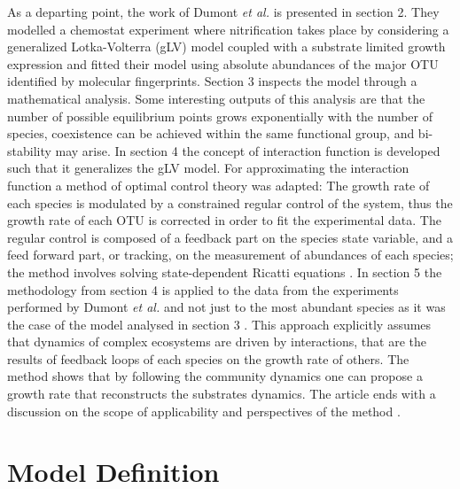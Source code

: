 \documentclass[processes,article,submit,moreauthors,pdftex]{Definitions/mdpi}
\begin{document}
As a departing point, the work of Dumont\textit{ et al.} \cite{Dumont2016} is presented in section 2. They modelled a chemostat experiment where nitrification takes place by considering a generalized Lotka-Volterra (gLV) model \cite{Hernandez-Bermejo1997} coupled with a substrate limited growth expression and fitted their model using absolute abundances of the major OTU identified by molecular fingerprints. Section 3 inspects the model through a mathematical analysis. Some interesting outputs of this analysis are that the number of possible equilibrium points grows exponentially with the number of species, coexistence can be achieved within the same functional group, and bi-stability may arise. In section 4 the concept of interaction function is developed such that it generalizes the gLV model. For approximating the interaction function a method of optimal control theory was adapted: The growth rate of each species is modulated by a constrained regular control of the system, thus the growth rate of each OTU is corrected in order to fit the experimental data. The regular control is composed of a feedback part on the species state variable, and a feed forward part, or tracking, on the measurement of abundances of each species; the method involves solving state-dependent Ricatti equations \cite{Cimen2008}. In section 5 the methodology from section 4 is applied to the data from the experiments performed by Dumont \textit{et al.} \cite{Dumont2009} and not just to the most abundant species as it was the case of the model analysed in section 3 \cite{Dumont2016}. This approach explicitly assumes that dynamics of complex ecosystems are driven by interactions, that are the results of feedback loops of each species on the growth rate of others. The method shows that by following the community dynamics one can propose a growth rate that reconstructs the substrates dynamics. The article ends with a discussion on the scope of applicability and perspectives of the method . 

\section{Model Definition}
\end{document}
